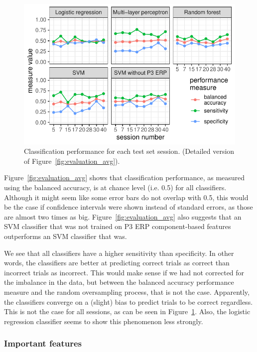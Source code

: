 \begin{figure}[!htpb]
  \includegraphics[width=\linewidth]{../stats/results/evaluation_detail.pdf}
  \caption{Classification performance for each test set session. (Detailed version of Figure~\ref{fig:evaluation_avg}).}
  \label{fig:evaluation_detail}
\end{figure}

Figure~\ref{fig:evaluation_avg} shows that classification performance, as
measured using the balanced accuracy, is at chance level (i.e. 0.5) for all
classifiers. Although it might seem like some error bars do not overlap with
0.5, this would be the case if confidence intervals were shown instead of
standard errors, as those are almost two times as big.
Figure~\ref{fig:evaluation_avg} also suggests that an SVM classifier that was
not trained on P3 ERP component-based features outperforms an SVM classifier
that was.

We see that all classifiers have a higher sensitivity than specificity. In other
words, the classifiers are better at predicting correct trials as correct than
incorrect trials as incorrect. This would make sense if we had not corrected for
the imbalance in the data, but between the balanced accuracy performance measure
and the random oversampling process, that is not the case. Apparently, the
classifiers converge on a (slight) bias to predict trials to be correct
regardless. This is not the case for all sessions, as can be seen in
Figure~\ref{fig:evaluation_detail}. Also, the logistic regression classifier
seems to show this phenomenon less strongly.

\subsubsection{Important features}

